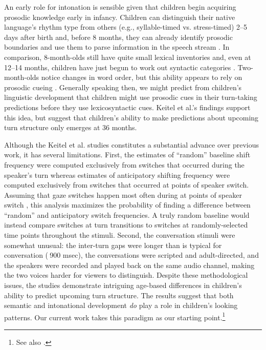 \documentclass[authoryear, 12pt]{elsarticle}
\begin{document}
An early role for intonation is sensible given that children begin acquiring prosodic knowledge early in infancy. Children can distinguish their native language's rhythm type from others (e.g., syllable-timed vs. stress-timed) 2--5 days after birth \citep{mehler1988, moon1993, nazzi2003} and, before 8 months, they can already identify prosodic boundaries and use them to parse information in the speech stream \citep{johnson2001, jusczyk1993, jusczyk1995, morgan1995, soderstrom2003}. In comparison, 8-month-olds still have quite small lexical inventories and, even at 12--14 months, children have just begun to work out syntactic categories \citep{bergelson2013, shi2010}. Two-month-olds notice changes in word order, but this ability appears to rely on prosodic cueing \citep{mandel1996}. Generally speaking then, we might predict from children's linguistic development that children might use prosodic cues in their turn-taking predictions before they use lexicosyntactic cues. Keitel et al.'s \citeyearpar{keitel2013, keitel2015} findings support this idea, but suggest that children's ability to make predictions about upcoming turn structure only emerges at 36 months.

Although the Keitel et al. \citeyearpar{keitel2013, keitel2015} studies constitutes a substantial advance over previous work, it has several limitations. First, the estimates of ``random'' baseline shift frequency were computed exclusively from switches that occurred during the speaker's turn whereas estimates of anticipatory shifting frequency were computed exclusively from switches that occurred at points of speaker switch. Assuming that gaze switches happen most often during at points of speaker switch \citep{hirvenkari2013}, this analysis maximizes the probability of finding a difference between ``random'' and anticipatory switch frequencies. A truly random baseline would instead compare switches at turn transitions to switches at randomly-selected time points throughout the stimuli. Second, the conversation stimuli were somewhat unusual: the inter-turn gaps were longer than is typical for conversation ($~$900 msec), the conversations were scripted and adult-directed, and the speakers were recorded and played back on the same audio channel, making the two voices harder for viewers to distinguish. Despite these methodological issues, the studies demonstrate intriguing age-based differences in children's ability to predict upcoming turn structure. The results suggest that both semantic and intonational development \textit{do} play a role in children's looking patterns. Our current work takes this paradigm as our starting point.\footnote{See also \citet{casillas2012, casillas2013}.}
\end{document}
